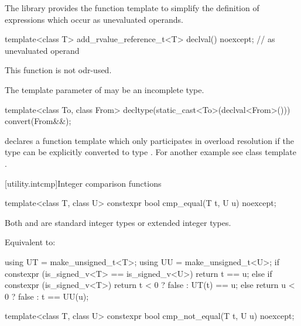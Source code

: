 \pnum
The library provides the function template  to simplify the definition of
expressions which occur as unevaluated operands.

%
\begin{itemdecl}
template<class T> add_rvalue_reference_t<T> declval() noexcept;    // as unevaluated operand
\end{itemdecl}

\begin{itemdescr}
\pnum
\mandates
This function is not odr-used.

\pnum
\remarks
The template parameter  of  may be an incomplete type.

\pnum
\begin{example}
\begin{codeblock}
template<class To, class From> decltype(static_cast<To>(declval<From>())) convert(From&&);
\end{codeblock}
declares a function template  which only participates in overload resolution if the
type  can be explicitly converted to type . For another example see class
template .
\end{example}
\end{itemdescr}

[utility.intcmp]{Integer comparison functions}

%
\begin{itemdecl}
template<class T, class U>
  constexpr bool cmp_equal(T t, U u) noexcept;
\end{itemdecl}

\begin{itemdescr}
\pnum
\mandates
Both  and  are standard integer types or
extended integer types.

\pnum
\effects
Equivalent to:
\begin{codeblock}
using UT = make_unsigned_t<T>;
using UU = make_unsigned_t<U>;
if constexpr (is_signed_v<T> == is_signed_v<U>)
  return t == u;
else if constexpr (is_signed_v<T>)
  return t < 0 ? false : UT(t) == u;
else
  return u < 0 ? false : t == UU(u);
\end{codeblock}
\end{itemdescr}

%
\begin{itemdecl}
template<class T, class U>
  constexpr bool cmp_not_equal(T t, U u) noexcept;
\end{itemdecl}

